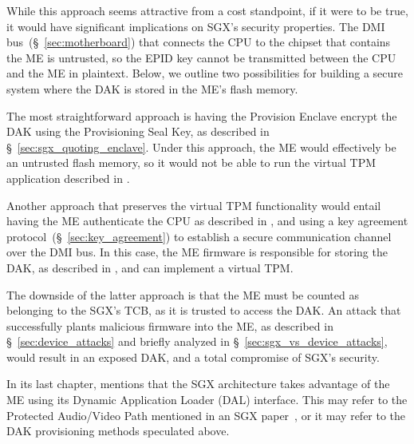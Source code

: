 While this approach seems attractive from a cost standpoint, if it were to be
true, it would have significant implications on SGX's security properties. The
DMI bus~(\S~\ref{sec:motherboard}) that connects the CPU to the chipset that
contains the ME is untrusted, so the EPID key cannot be transmitted between the
CPU and the ME in plaintext. Below, we outline two possibilities for building a
secure system where the DAK is stored in the ME's flash memory.

The most straightforward approach is having the Provision Enclave encrypt the
DAK using the Provisioning Seal Key, as described in
\S~\ref{sec:sgx_quoting_enclave}. Under this approach, the ME would effectively
be an untrusted flash memory, so it would not be able to run the virtual TPM
application described in \cite{ruan2014intelme}.

Another approach that preserves the virtual TPM functionality would entail
having the ME authenticate the CPU as described in \cite{costan2011spchip}, and
using a key agreement protocol~(\S~\ref{sec:key_agreement}) to establish a
secure communication channel over the DMI bus. In this case, the ME firmware is
responsible for storing the DAK, as described in \cite{ruan2014intelme}, and
can implement a virtual TPM.

The downside of the latter approach is that the ME must be counted as belonging
to the SGX's TCB, as it is trusted to access the DAK. An attack that
successfully plants malicious firmware into the ME, as described in
\S~\ref{sec:device_attacks} and briefly analyzed in
\S~\ref{sec:sgx_vs_device_attacks}, would result in an exposed DAK, and a total
compromise of SGX's security.


In its last chapter, \cite{ruan2014intelme} mentions that the SGX architecture
takes advantage of the ME using its Dynamic Application Loader (DAL) interface.
This may refer to the Protected Audio/Video Path mentioned in an SGX
paper~\cite{hoekstra2013sgx}, or it may refer to the DAK provisioning methods
speculated above.
